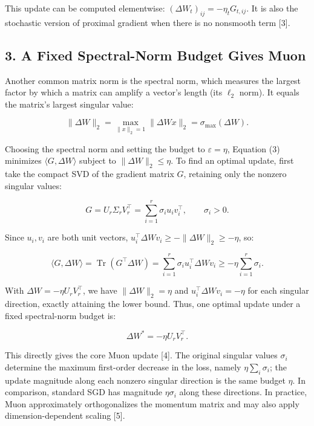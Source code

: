 \documentclass[
  english,
  10pt,
  a4paper,
]{article}
\begin{document}
This update can be computed elementwise:
\((\Delta W_t)_{ij}=-\eta_t G_{t,ij}\). It is also the stochastic
version of proximal gradient when there is no nonsmooth term {[}3{]}.

\subsection{3. A Fixed Spectral-Norm Budget Gives
Muon}\label{a-fixed-spectral-norm-budget-gives-muon}

Another common matrix norm is the spectral norm, which measures the
largest factor by which a matrix can amplify a vector's length (its
\(\ell_2\) norm). It equals the matrix's largest singular value:

\nopagebreak[4]

\[
\|\Delta W\|_2=\max_{\|x\|_2=1}\|\Delta W x\|_2=\sigma_{\max}(\Delta W).
\tag{9}
\]

Choosing the spectral norm and setting the budget to
\(\varepsilon=\eta\), Equation (3) minimizes
\(\langle G,\Delta W\rangle\) subject to \(\|\Delta W\|_2\leq\eta\). To
find an optimal update, first take the compact SVD of the gradient
matrix \(G\), retaining only the nonzero singular values:

\nopagebreak[4]

\[
G=U_r\Sigma_rV_r^\top
=\sum_{i=1}^r\sigma_i u_iv_i^\top,\qquad \sigma_i>0.
\tag{10}
\]

Since \(u_i,v_i\) are both unit vectors,
\(u_i^\top\Delta W v_i\geq-\|\Delta W\|_2\geq-\eta\), so:

\nopagebreak[4]

\[
\langle G,\Delta W\rangle
=\operatorname{Tr}(G^\top\Delta W)
=\sum_{i=1}^r\sigma_i u_i^\top\Delta W v_i
\geq-\eta\sum_{i=1}^r\sigma_i.
\tag{11}
\]

With \(\Delta W=-\eta U_rV_r^\top\), we have \(\|\Delta W\|_2=\eta\) and
\(u_i^\top\Delta W v_i=-\eta\) for each singular direction, exactly
attaining the lower bound. Thus, one optimal update under a fixed
spectral-norm budget is:

\nopagebreak[4]

\[
\boxed{\Delta W^*=-\eta U_rV_r^\top.}
\tag{12}
\]

This directly gives the core Muon update {[}4{]}. The original singular
values \(\sigma_i\) determine the maximum first-order decrease in the
loss, namely \(\eta\sum_i\sigma_i\); the update magnitude along each
nonzero singular direction is the same budget \(\eta\). In comparison,
standard SGD has magnitude \(\eta\sigma_i\) along these directions. In
practice, Muon approximately orthogonalizes the momentum matrix and may
also apply dimension-dependent scaling {[}5{]}.
\end{document}
